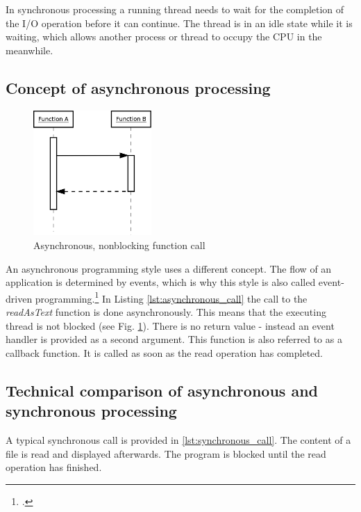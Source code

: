 In synchronous processing a running thread needs to wait for the completion of
the I/O operation before it can continue.
The thread is in an idle state while it is waiting, which allows another process 
or thread to occupy the CPU in the meanwhile.
\FloatBarrier
\subsection{Concept of asynchronous processing}
\label{concept_async}
\FloatBarrier

\begin{figure}[hbtp]
\centering
\includegraphics[width=0.4\textwidth]{img/asynch_call.png}
\caption{Asynchronous, nonblocking function call}
\label{fig:asynch_call}
\end{figure}

An asynchronous programming style uses a different concept. The flow of an
application is determined by events, which is why this style is also called
event-driven programming.\footcite[Cf.][16]{teixeira_2012} In Listing \ref{lst:asynchronous_call} the call
to the \textit{readAsText} function is done asynchronously. This means
that the executing thread is not blocked (see Fig. \ref{fig:asynch_call}). There is no
return value - instead an event handler is provided as a second argument.
This function is also referred to as a callback function. It is called
as soon as the read operation has completed.



\subsection{Technical comparison of asynchronous and synchronous processing}
\label{comparison_syncasync}


A typical synchronous call is provided in \autoref{lst:synchronous_call}. The
content of a file is read and displayed afterwards. The program is blocked until the
read operation has finished.

